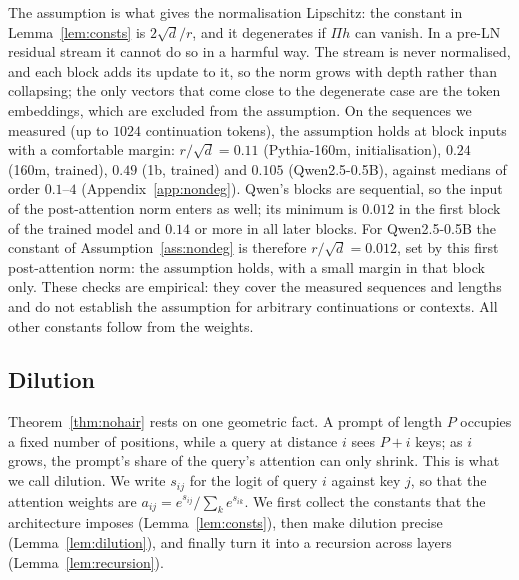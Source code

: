 \documentclass[11pt]{article}
\theoremstyle{definition}
\theoremstyle{remark}
\begin{document}
The assumption is what gives the normalisation Lipschitz: the constant in Lemma~\ref{lem:consts} is $2\sqrt d/r$, and it degenerates if $\Pi h$ can vanish. In a pre-LN residual stream it cannot do so in a harmful way. The stream is never normalised, and each block adds its update to it, so the norm grows with depth rather than collapsing; the only vectors that come close to the degenerate case are the token embeddings, which are excluded from the assumption. On the sequences we measured (up to $1024$ continuation tokens), the assumption holds at block inputs with a comfortable margin: $r/\sqrt d=0.11$ (Pythia-160m, initialisation), $0.24$ (160m, trained), $0.49$ (1b, trained) and $0.105$ (Qwen2.5-0.5B), against medians of order $0.1$--$4$ (Appendix~\ref{app:nondeg}). Qwen's blocks are sequential, so the input of the post-attention norm enters as well; its minimum is $0.012$ in the first block of the trained model and $0.14$ or more in all later blocks. For Qwen2.5-0.5B the constant of Assumption~\ref{ass:nondeg} is therefore $r/\sqrt d=0.012$, set by this first post-attention norm: the assumption holds, with a small margin in that block only. These checks are empirical: they cover the measured sequences and lengths and do not establish the assumption for arbitrary continuations or contexts. All other constants follow from the weights.


\subsection{Dilution}
\label{sec:theory-dilution}

Theorem~\ref{thm:nohair} rests on one geometric fact. A prompt of length $P$ occupies a fixed number of positions, while a query at distance $i$ sees $P+i$ keys; as $i$ grows, the prompt's share of the query's attention can only shrink. This is what we call dilution. We write $s_{ij}$ for the logit of query $i$ against key $j$, so that the attention weights are $a_{ij}=e^{s_{ij}}/\sum_ke^{s_{ik}}$. We first collect the constants that the architecture imposes (Lemma~\ref{lem:consts}), then make dilution precise (Lemma~\ref{lem:dilution}), and finally turn it into a recursion across layers (Lemma~\ref{lem:recursion}).
\end{document}
